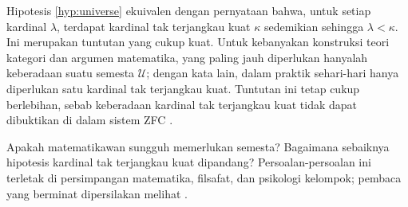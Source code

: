 \begin{remark}
	Hipotesis \ref{hyp:universe} ekuivalen dengan pernyataan bahwa, untuk setiap kardinal $\lambda$, terdapat kardinal tak terjangkau kuat $\kappa$ sedemikian sehingga $\lambda < \kappa$. Ini merupakan tuntutan yang cukup kuat. Untuk kebanyakan konstruksi teori kategori dan argumen matematika, yang paling jauh diperlukan hanyalah keberadaan suatu semesta $\mathcal{U}$; dengan kata lain, dalam praktik sehari-hari hanya diperlukan satu kardinal tak terjangkau kuat. Tuntutan ini tetap cukup berlebihan, sebab keberadaan kardinal tak terjangkau kuat tidak dapat dibuktikan di dalam sistem ZFC \cite[Theorem 12.12]{Je03}.
\end{remark}

Apakah matematikawan sungguh memerlukan semesta? Bagaimana sebaiknya hipotesis kardinal tak terjangkau kuat dipandang? Persoalan-persoalan ini terletak di persimpangan matematika, filsafat, dan psikologi kelompok; pembaca yang berminat dipersilakan melihat \cite{Shu08}.

